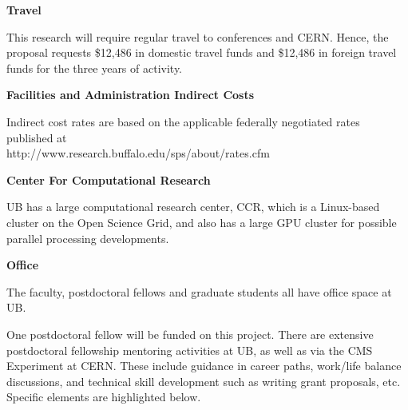 \documentclass[times,11pt]{article}
\begin{document}
\bigskip
{\bf Travel}
\bigskip

This research will require regular travel to conferences and
CERN. Hence, the proposal requests
\$12,486 in domestic travel funds and \$12,486 in foreign travel funds
for the three years of activity. 

\bigskip
{\bf Facilities and Administration Indirect Costs}
\bigskip

Indirect cost rates are based on the applicable federally negotiated
rates published at 
\\
http://www.research.buffalo.edu/sps/about/rates.cfm





\newpage
{}
\renewcommand{\thepage} {C--\arabic{page}}


\bigskip
{\bf Center For Computational Research}

UB has a large computational research center, CCR, which is a
Linux-based cluster on the Open Science Grid, and also has a large GPU
cluster for possible parallel processing developments. 

\bigskip
{\bf Office}

The faculty, postdoctoral fellows and graduate students all have
office space at UB. 


\newpage
{}
\renewcommand{\thepage} {D--\arabic{page}}

One postdoctoral fellow will be funded on this project. There are
extensive postdoctoral fellowship mentoring activities at UB, as well
as via the CMS
Experiment at CERN. These include guidance in career paths,
work/life balance discussions, and technical skill development such as
writing grant proposals, etc. Specific elements are highlighted
below. 
\end{document}
